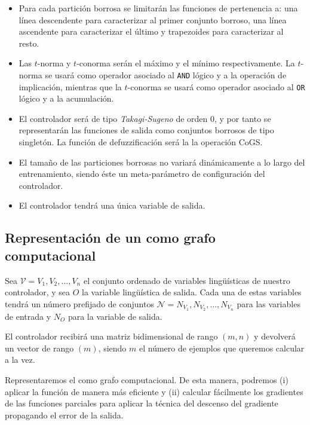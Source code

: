 \begin{itemize}
	\item Para cada partición borrosa se limitarán las funciones de pertenencia a: una línea descendente para caracterizar al primer conjunto borroso, una línea ascendente para caracterizar el último y trapezoides para caracterizar al resto.
	\item Las $t$-norma y $t$-conorma serán el máximo y el mínimo respectivamente. La $t$-norma se usará como operador asociado al \texttt{AND} lógico y a la operación de implicación, mientras que la $t$-conorma se usará como operador asociado al \texttt{OR} lógico y a la acumulación.
	\item El controlador será de tipo \textit{Takagi-Sugeno} de orden $0$, y por tanto se representarán las funciones de salida como conjuntos borrosos de tipo singletón. La función de defuzzificación será la la operación CoGS.
	\item El tamaño de las particiones borrosas no variará dinámicamente a lo largo del entrenamiento, siendo éste un meta-parámetro de configuración del controlador.
	\item El controlador tendrá una única variable de salida.
\end{itemize}

\subsection{Representación de un  como grafo computacional}

Sea $\mathcal{V} = {V_1, V_2, \ldots, V_n}$ el conjunto ordenado de variables lingüísticas de nuestro controlador, y sea $O$ la variable lingüística de salida. Cada una de estas variables tendrá un número prefijado de conjuntos $\mathcal{N} = {N_{V_1}, N_{V_2}, \ldots, N_{V_n}}$ para las variables de entrada y $N_O$ para la variable de salida.

El controlador recibirá una matriz bidimensional de rango $(m, n)$ y devolverá un vector de rango $(m)$, siendo $m$ el número de ejemplos que queremos calcular a la vez.

Representaremos el  como grafo computacional. De esta manera, podremos (i) aplicar la función de manera más eficiente y (ii) calcular fácilmente los gradientes de las funciones parciales para aplicar la técnica del descenso del gradiente propagando el error de la salida.

